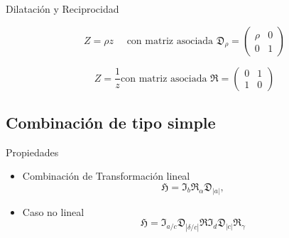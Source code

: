 \documentclass{beamer}
\newenvironment{Teorema}[1]{
  \begin{tcolorbox}[colback=blockbackground,colframe=ritsumeikan,title=#1]
}{
  \end{tcolorbox}
}
\begin{document}
\begin{frame}{Dilatación y Reciprocidad}
    \begin{Teorema}{Dilatación}
        \begin{equation}
            Z=\rho z \quad \text{ con matriz asociada }\mathfrak{D}_\rho =
            \begin{pmatrix}
                \rho & 0\\
                0 & 1
            \end{pmatrix}
            \label{eq:(32)}
        \end{equation}
    \end{Teorema}
    \begin{Teorema}{Reciprocidad}
        \begin{equation}
            Z=\frac{1}{z} \text{con matriz asociada } \mathfrak{R}=
            \begin{pmatrix}
                0 & 1\\
                1 & 0
            \end{pmatrix}
            \label{eq:(33)}
        \end{equation}
    \end{Teorema}
\end{frame}
\subsection{Combinación de tipo simple}
\begin{frame}{Propiedades}
    \begin{itemize}
        \item Combinación de Transformación lineal
        \begin{equation*}
            \mathfrak{H}=\mathfrak{I}_b\mathfrak{R}_\alpha\mathfrak{D}_{|a|},
        \end{equation*}
        \item Caso no lineal
        \begin{equation*}
            \mathfrak{H}=\mathfrak{I}_{a/c}\mathfrak{D}_{|\delta/c|}\mathfrak{R}\mathfrak{I}_{d}\mathfrak{D}_{|c|}\mathfrak{R}_{\gamma}
        \end{equation*}
    \end{itemize}
\end{frame}
\end{document}
